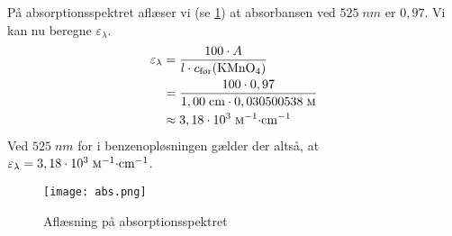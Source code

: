 \documentclass{report}
\begin{document}
På absorptionsspektret aflæser vi (se \cref{fig:abs}) at absorbansen ved $525 \;\unit{nm} $ er $0,97$. Vi kan nu beregne $\varepsilon _{\lambda }$.
\begin{equation*}
\begin{split}
  \varepsilon _{\lambda } &=\frac{100 \cdot A}{l \cdot c_{\text{før} }(\ce{KMnO4})}\\
  &=\frac{100 \cdot 0,97}{1,00 \;\unit{cm} \cdot  0,030500538 \;\unit{\textsc{m}} }\\
  &\approx 3,18 \cdot 10^3 \;\unit{\textsc{m}^{-1} \cdot cm ^{-1}} 
\end{split}
\end{equation*}
Ved $525 \;\unit{nm} $ for   i benzenopløsningen gælder der altså, at $\varepsilon _{\lambda } = 3,18 \cdot 10 ^{3} \;\unit{\textsc{m} ^{-1} \cdot cm ^{-1}} $. 
\begin{figure}[H]
\begin{center}
  \texttt{[image: abs.png]}
\end{center}
\caption{Aflæsning på absorptionsspektret}
  \label{fig:abs}
\end{figure}
\end{document}

